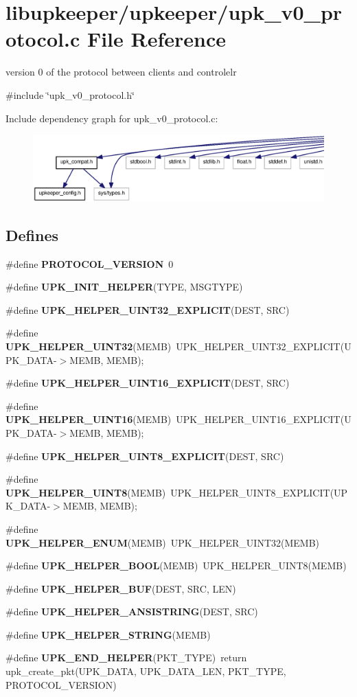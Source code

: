 \section{libupkeeper/upkeeper/upk\_\-v0\_\-protocol.c File Reference}
\label{upk__v0__protocol_8c}


version 0 of the protocol between clients and controlelr  


{\ttfamily \#include \char`\"{}upk\_\-v0\_\-protocol.h\char`\"{}}\par
Include dependency graph for upk\_\-v0\_\-protocol.c:\nopagebreak
\begin{figure}[H]
\begin{center}
\leavevmode
\includegraphics[width=400pt]{upk__v0__protocol_8c__incl}
\end{center}
\end{figure}
\subsection*{Defines}
\begin{DoxyCompactItemize}
\item 
\#define {\bf PROTOCOL\_\-VERSION}~0
\item 
\#define {\bf UPK\_\-INIT\_\-HELPER}(TYPE, MSGTYPE)
\item 
\#define {\bf UPK\_\-HELPER\_\-UINT32\_\-EXPLICIT}(DEST, SRC)
\item 
\#define {\bf UPK\_\-HELPER\_\-UINT32}(MEMB)~UPK\_\-HELPER\_\-UINT32\_\-EXPLICIT(UPK\_\-DATA-\/$>$MEMB, MEMB);
\item 
\#define {\bf UPK\_\-HELPER\_\-UINT16\_\-EXPLICIT}(DEST, SRC)
\item 
\#define {\bf UPK\_\-HELPER\_\-UINT16}(MEMB)~UPK\_\-HELPER\_\-UINT16\_\-EXPLICIT(UPK\_\-DATA-\/$>$MEMB, MEMB);
\item 
\#define {\bf UPK\_\-HELPER\_\-UINT8\_\-EXPLICIT}(DEST, SRC)
\item 
\#define {\bf UPK\_\-HELPER\_\-UINT8}(MEMB)~UPK\_\-HELPER\_\-UINT8\_\-EXPLICIT(UPK\_\-DATA-\/$>$MEMB, MEMB);
\item 
\#define {\bf UPK\_\-HELPER\_\-ENUM}(MEMB)~UPK\_\-HELPER\_\-UINT32(MEMB)
\item 
\#define {\bf UPK\_\-HELPER\_\-BOOL}(MEMB)~UPK\_\-HELPER\_\-UINT8(MEMB)
\item 
\#define {\bf UPK\_\-HELPER\_\-BUF}(DEST, SRC, LEN)
\item 
\#define {\bf UPK\_\-HELPER\_\-ANSISTRING}(DEST, SRC)
\item 
\#define {\bf UPK\_\-HELPER\_\-STRING}(MEMB)
\item 
\#define {\bf UPK\_\-END\_\-HELPER}(PKT\_\-TYPE)~return upk\_\-create\_\-pkt(UPK\_\-DATA, UPK\_\-DATA\_\-LEN, PKT\_\-TYPE, PROTOCOL\_\-VERSION)
\end{DoxyCompactItemize}
